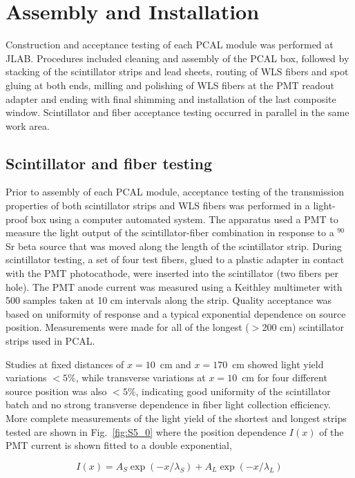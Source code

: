 \section{Assembly and Installation}
Construction and acceptance testing of each PCAL module was performed at JLAB.  Procedures included cleaning and assembly of the PCAL box, followed by stacking of the scintillator strips and lead sheets, routing of WLS fibers and spot gluing at both ends, milling and polishing of WLS fibers at the PMT readout adapter and ending with final shimming and installation of the last composite window.  Scintillator and fiber acceptance testing occurred in parallel in the same work area.


\subsection{Scintillator and fiber testing}
Prior to assembly of each PCAL module, acceptance testing of the transmission properties of both scintillator strips and WLS fibers was performed in a light-proof box using a computer automated system.  The apparatus used a PMT to measure the light output of the scintillator-fiber combination in response to a $^{90}$Sr beta source that was moved along the length of the scintillator strip. During scintillator testing, a set of four test fibers, glued to a plastic adapter in contact with the PMT photocathode, were inserted into the scintillator (two fibers per hole).  The PMT anode current was measured using a Keithley multimeter with 500 samples taken at 10 cm intervals along the strip.  Quality acceptance was based on uniformity of response and a typical exponential dependence on source position. Measurements were made for all of the longest ($>$200 cm) scintillator strips used in PCAL.

Studies at fixed distances of $x=10$~cm and $x=170$~cm showed light yield variations $<5\%$, while transverse variations at $x=10$~cm for four different source  position was also $<5\%$, indicating good uniformity of the scintillator batch and no strong transverse dependence in fiber light collection efficiency.  More complete measurements of the light yield of the shortest and longest strips tested are shown in Fig.~\ref{fig:S5_0} where the position dependence $I(x)$ of the PMT current is shown fitted to a double exponential,

\begin{equation}
I(x) = A_S \exp(-x/\lambda_S)+A_L \exp(-x/\lambda_L)
\end{equation}


